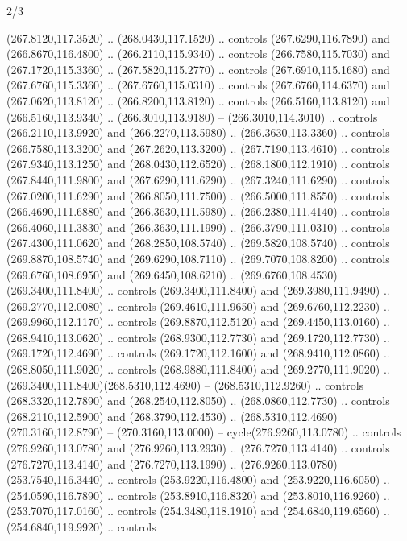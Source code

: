 \begin{flagdescription}{2/3}
\begin{scope}[xshift=0.5\flaglength,yshift=0.5\flagwidth,scale=\flagwidth/259.2]
\begin{scope}[y=0.8pt, x=0.8pt, yscale=-1,shift={(-243,-162)}]
      (267.8120,117.3520) .. (268.0430,117.1520) .. controls (267.6290,116.7890) and
      (266.8670,116.4800) .. (266.2110,115.9340) .. controls (266.7580,115.7030) and
      (267.1720,115.3360) .. (267.5820,115.2770) .. controls (267.6910,115.1680) and
      (267.6760,115.3360) .. (267.6760,115.0310) .. controls (267.6760,114.6370) and
      (267.0620,113.8120) .. (266.8200,113.8120) .. controls (266.5160,113.8120) and
      (266.5160,113.9340) .. (266.3010,113.9180) -- (266.3010,114.3010) .. controls
      (266.2110,113.9920) and (266.2270,113.5980) .. (266.3630,113.3360) .. controls
      (266.7580,113.3200) and (267.2620,113.3200) .. (267.7190,113.4610) .. controls
      (267.9340,113.1250) and (268.0430,112.6520) .. (268.1800,112.1910) .. controls
      (267.8440,111.9800) and (267.6290,111.6290) .. (267.3240,111.6290) .. controls
      (267.0200,111.6290) and (266.8050,111.7500) .. (266.5000,111.8550) .. controls
      (266.4690,111.6880) and (266.3630,111.5980) .. (266.2380,111.4140) .. controls
      (266.4060,111.3830) and (266.3630,111.1990) .. (266.3790,111.0310) .. controls
      (267.4300,111.0620) and (268.2850,108.5740) .. (269.5820,108.5740) .. controls
      (269.8870,108.5740) and (269.6290,108.7110) .. (269.7070,108.8200) .. controls
      (269.6760,108.6950) and (269.6450,108.6210) ..
      (269.6760,108.4530)(269.3400,111.8400) .. controls (269.3400,111.8400) and
      (269.3980,111.9490) .. (269.2770,112.0080) .. controls (269.4610,111.9650) and
      (269.6760,112.2230) .. (269.9960,112.1170) .. controls (269.8870,112.5120) and
      (269.4450,113.0160) .. (268.9410,113.0620) .. controls (268.9300,112.7730) and
      (269.1720,112.7730) .. (269.1720,112.4690) .. controls (269.1720,112.1600) and
      (268.9410,112.0860) .. (268.8050,111.9020) .. controls (268.9880,111.8400) and
      (269.2770,111.9020) .. (269.3400,111.8400)(268.5310,112.4690) --
      (268.5310,112.9260) .. controls (268.3320,112.7890) and (268.2540,112.8050) ..
      (268.0860,112.7730) .. controls (268.2110,112.5900) and (268.3790,112.4530) ..
      (268.5310,112.4690)(270.3160,112.8790) -- (270.3160,113.0000) --
      cycle(276.9260,113.0780) .. controls (276.9260,113.0780) and
      (276.9260,113.2930) .. (276.7270,113.4140) .. controls (276.7270,113.4140) and
      (276.7270,113.1990) .. (276.9260,113.0780)(253.7540,116.3440) .. controls
      (253.9220,116.4800) and (253.9220,116.6050) .. (254.0590,116.7890) .. controls
      (253.8910,116.8320) and (253.8010,116.9260) .. (253.7070,117.0160) .. controls
      (254.3480,118.1910) and (254.6840,119.6560) .. (254.6840,119.9920) .. controls

\end{scope}
\end{scope}
\end{flagdescription}
